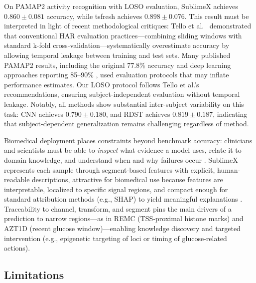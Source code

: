 \documentclass[times, review, 10pt]{elsarticle}
\begin{document}
On PAMAP2 activity recognition with LOSO evaluation, SublimeX achieves
$0.860 \pm 0.081$ accuracy, while tsfresh achieves $0.898 \pm 0.076$. This
result must be interpreted in light of recent methodological critiques: Tello
et al.\ \cite{tello2025contrasting} demonstrated that conventional HAR
evaluation practices---combining sliding windows with standard k-fold
cross-validation---systematically overestimate accuracy by allowing temporal
leakage between training and test sets. Many published PAMAP2 results,
including the original 77.8\% accuracy \cite{reiss2013confidence} and deep
learning approaches reporting 85--90\% \cite{ordonez2016deep_activity}, used
evaluation protocols that may inflate performance estimates. Our LOSO protocol
follows Tello et al.'s recommendations, ensuring subject-independent evaluation
without temporal leakage. Notably, all methods show substantial inter-subject
variability on this task: CNN achieves $0.790 \pm 0.180$, and RDST achieves
$0.819 \pm 0.187$, indicating that subject-dependent generalization remains challenging regardless of method.

Biomedical deployment places constraints beyond benchmark accuracy: clinicians and scientists must be able to \emph{inspect} what evidence
a model uses, relate it to domain knowledge, and understand when and why failures occur \cite{tonekaboni2019clinicians, caruana2015intelligible}.
SublimeX represents each sample through segment-based features with explicit, human-readable
descriptions, attractive for biomedical use because features are interpretable, localized to specific signal regions, and compact enough for
standard attribution methods (e.g., SHAP) to yield meaningful explanations \cite{fulcher2018feature}. Traceability to channel, transform, and segment pins the main drivers of a prediction to narrow regions---as in REMC (TSS-proximal histone marks) and AZT1D (recent glucose window)---enabling knowledge discovery and targeted intervention (e.g., epigenetic targeting of loci or timing of glucose-related actions).

\subsection{Limitations}
\end{document}
